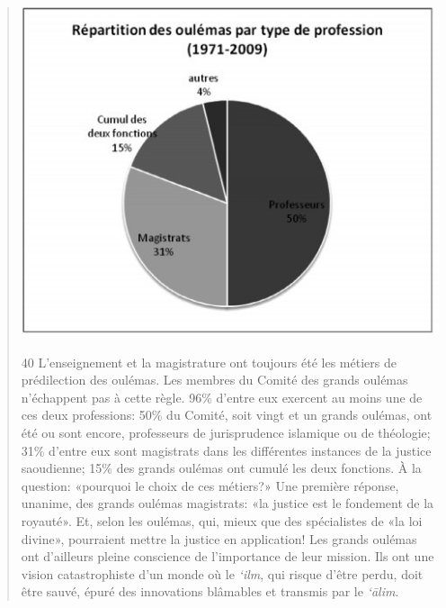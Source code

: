 \begin{quote}
\begin{marginfigure}
\includegraphics[width=1.2\textwidth]{CourantsIslamContemporain/ImagesCourantsIslamContemporain/image15.jpeg}
\end{marginfigure}

40
L'enseignement et la magistrature ont toujours été les métiers de
prédilection des oulémas. Les membres du Comité des grands oulémas
n'échappent pas à cette règle. 96\% d'entre eux exercent au moins une de
ces deux professions: 50\% du Comité, soit vingt et un grands oulémas,
ont été ou sont encore, professeurs de jurisprudence islamique ou de
théologie; 31\% d'entre eux sont magistrats dans les différentes
instances de la justice saoudienne; 15\% des grands oulémas ont cumulé
les deux fonctions. À la question: «pourquoi le choix de ces métiers?»
Une première réponse, unanime, des grands oulémas magistrats: «la
justice est le fondement de la royauté». Et, selon les oulémas, qui,
mieux que des spécialistes de «la loi divine», pourraient mettre la
justice en application! Les grands oulémas ont d'ailleurs pleine
conscience de l'importance de leur mission. Ils ont une vision
catastrophiste d'un monde où le \emph{`ilm}, qui risque d'être perdu,
doit être sauvé, épuré des innovations blâmables et transmis par le
\emph{`ālim}.


\end{quote}
